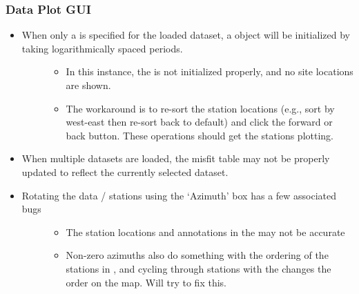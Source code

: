 \documentclass[letterpaper,10pt,english]{sphinxmanual}
\begin{document}
\subsubsection{Data Plot GUI}
\label{\detokenize{content/misc/DISCLAIMER:data-plot-gui}}\begin{itemize}
\item {} \begin{description}
\item[{When only a {\hyperref[\detokenize{content/api_core/input_files:list-file}]{}} is specified for the loaded dataset, a {\hyperref[\detokenize{content/api_core/data_structures:data}]{}} object will be initialized by taking logarithmically spaced periods.}] \leavevmode\begin{itemize}
\item {} 
In this instance, the {\hyperref[\detokenize{content/data_plot/map_viewer:map-viewer}]{}} is not initialized properly, and no site locations are shown.

\item {} 
The workaround is to re-sort the station locations (e.g., sort by west-east then re-sort back to default) and click the forward or back button. These operations should get the stations plotting.

\end{itemize}

\end{description}

\item {} 
When multiple datasets are loaded, the misfit table may not be properly updated to reflect the currently selected dataset.

\item {} \begin{description}
\item[{Rotating the data / stations using the ‘Azimuth’ box has a few associated bugs}] \leavevmode\begin{itemize}
\item {} 
The station locations and annotations in the {\hyperref[\detokenize{content/data_plot/map_viewer:map-viewer}]{}} may not be accurate

\item {} 
Non-zero azimuths also do something with the ordering of the stations in {\hyperref[\detokenize{content/data_plot/map_viewer:map-viewer}]{}}, and cycling through stations with the {\hyperref[\detokenize{content/data_plot/main_window:forward-and-back-buttons}]{}} changes the order on the map. Will try to fix this.


\end{itemize}
\end{description}
\end{itemize}
\end{document}
